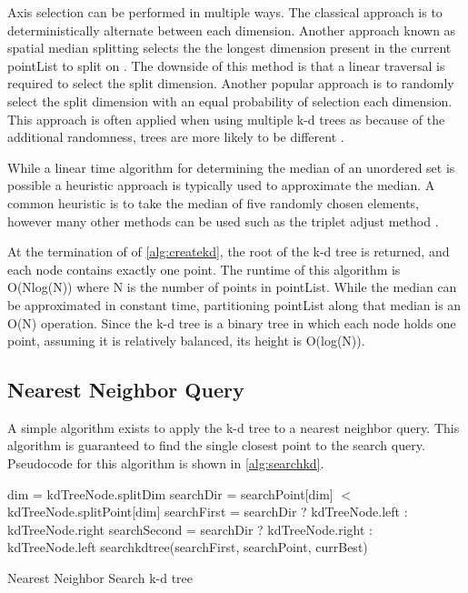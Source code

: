 Axis selection can be performed in multiple ways.  The classical approach is to deterministically alternate between each dimension.  Another approach known as spatial median splitting selects the the longest dimension present in the current pointList to split on \citep{zhou2008real}.  The downside of this method is that a linear traversal is required to select the split dimension.  Another popular approach is to randomly select the split dimension with an equal probability of selection each dimension.  This approach is often applied when using multiple k-d trees as because of the additional randomness, trees are more likely to be different \citep{flann_pami_2014}.

While a linear time algorithm for determining the median of an unordered set is possible \citep{megiddo1984linear} a heuristic approach is typically used to approximate the median.  A common heuristic is to take the median of five randomly chosen elements, however many other methods can be used such as the triplet adjust method \citep{battiato2000efficient}.

At the termination of of \ref{alg:createkd}, the root of the k-d tree is returned, and each node contains exactly one point.  The runtime of this algorithm is O(Nlog(N)) where N is the number of points in pointList.  While the median can be approximated in constant time, partitioning pointList along that median is an O(N) operation.  Since the k-d tree is a binary tree in which each node holds one point, assuming it is relatively balanced, its height is O(log(N)).

\subsection{Nearest Neighbor Query}

A simple algorithm exists to apply the k-d tree to a nearest neighbor query.  This algorithm is guaranteed to find the single closest point to the search query.  Pseudocode for this algorithm is shown in \ref{alg:searchkd}.

\begin{algorithm}
\begin{algorithmic}
\label{alg:searchkd}
	\State dim = kdTreeNode.splitDim
	\State searchDir = searchPoint[dim] $<$ kdTreeNode.splitPoint[dim]
	\State searchFirst = searchDir ? kdTreeNode.left : kdTreeNode.right
	\State searchSecond = searchDir ? kdTreeNode.right : kdTreeNode.left
	\State searchkdtree(searchFirst, searchPoint, currBest)
	\State

\EndFunction
\end{algorithmic}
\caption{Nearest Neighbor Search k-d tree}
\label{alg:querykd}
\end{algorithm}

